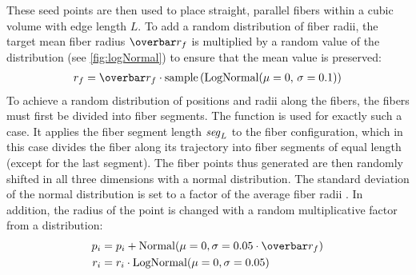 %
These seed points are then used to place straight, parallel fibers within a cubic volume with edge length $L$.
To add a random distribution of fiber radii, the target mean fiber radius $\fiberRadiusMean$ is multiplied by a random value of the  distribution (see \cref{fig:logNormal}) to ensure that the mean value is preserved:
\begin{align}
\fiberRadius = \fiberRadiusMean \cdot \mathrm{sample}\left(\mathrm{LogNormal}(\mu=0, \, \sigma=0.1)\right)
\end{align}
%
To achieve a random distribution of positions and radii along the fibers, the fibers must first be divided into fiber segments.
The function  is used for exactly such a case.
It applies the fiber segment length $\textnormal{$\mathit{seg}_{L}$}$ to the fiber configuration, which in this case divides the fiber along its trajectory into fiber segments of equal length (except for the last segment).
The fiber points thus generated are then randomly shifted in all three dimensions with a normal distribution.
The standard deviation of the normal distribution is set to a factor of the average fiber radii \fiberRadiusMean{}.
In addition, the radius of the point is changed with a random multiplicative factor from a  distribution:
%
\begin{align}
\begin{split}
p_i &= p_i + \mathrm{Normal}(\mu=0,\sigma=0.05 \cdot \fiberRadiusMean)\\
r_i &= r_i \cdot \mathrm{LogNormal}(\mu=0,\sigma=0.05)
\end{split}
\end{align}
%
%
%
